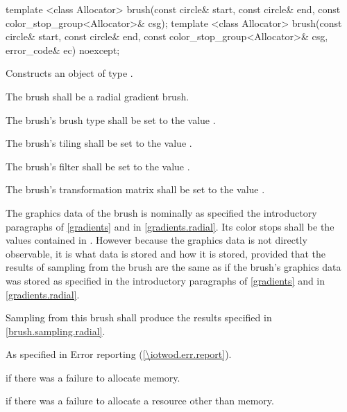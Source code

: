 \begin{itemdecl}
template <class Allocator>
brush(const circle& start, const circle& end,
  const color_stop_group<Allocator>& csg);
template <class Allocator>
brush(const circle& start, const circle& end,
  const color_stop_group<Allocator>& csg, error_code& ec) noexcept;
\end{itemdecl}
\begin{itemdescr}
\pnum
\effects
Constructs an object of type .

\pnum
The brush shall be a radial gradient brush.

\pnum
The brush's brush type shall be set to the value .

\pnum
The brush's tiling shall be set to the value .

\pnum
The brush's filter shall be set to the value .

\pnum
The brush's transformation matrix shall be set to the value .

\pnum
The graphics data of the brush is nominally as specified the introductory paragraphs of \ref{gradients} and in \ref{gradients.radial}. Its color stops shall be the values contained in . However because the graphics data is not directly observable, it is \unspecnorm what data is stored and how it is stored, provided that the results of sampling from the brush are the same as if the brush's graphics data was stored as specified in the introductory paragraphs of \ref{gradients} and in \ref{gradients.radial}.

\pnum
\remarks
Sampling from this brush shall produce the results specified in \ref{brush.sampling.radial}.

\pnum
\throws
As specified in Error reporting (\ref{\iotwod.err.report}).

\pnum
\errors
{} if there was a failure to allocate memory.

 if there was a failure to allocate a resource other than memory.
\end{itemdescr}

